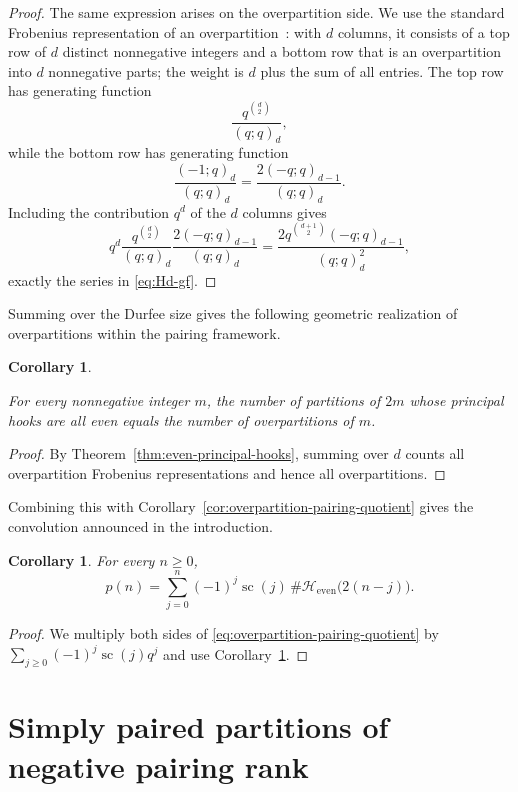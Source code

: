 \documentclass[11pt]{article}
\newtheorem{corollary}[theorem]{Corollary}
\theoremstyle{definition}
\theoremstyle{remark}
\begin{document}
\begin{proof}
The same expression arises on the overpartition side.  We use the standard Frobenius representation of an overpartition~\cite{Lovejoy2005}: with $d$ columns, it consists of a top row of $d$ distinct nonnegative integers and a bottom row that is an overpartition into $d$ nonnegative parts; the weight is $d$ plus the sum of all entries.  The top row has generating function
\[
 \frac{q^{\binom d2}}{(q;q)_d},
\]
while the bottom row has generating function
\[
 \frac{(-1;q)_d}{(q;q)_d}
 =\frac{2(-q;q)_{d-1}}{(q;q)_d}.
\]
Including the contribution $q^d$ of the $d$ columns gives
\[
 q^d\frac{q^{\binom d2}}{(q;q)_d}
 \frac{2(-q;q)_{d-1}}{(q;q)_d}
 =\frac{2q^{\binom{d+1}{2}}(-q;q)_{d-1}}{(q;q)_d^2},
\]
exactly the series in \eqref{eq:Hd-gf}.  
\end{proof}

Summing over the Durfee size gives the following geometric realization of overpartitions within the pairing framework. 

\begin{corollary}\label{cor:even-hooks-overpartitions}

For every nonnegative integer $m$, the number of partitions of $2m$ whose principal hooks are all even equals the number of overpartitions of $m$.

\end{corollary}

\begin{proof}
By Theorem~\ref{thm:even-principal-hooks}, summing over $d$ counts all overpartition Frobenius representations and hence all overpartitions.
\end{proof}

Combining this with Corollary~\ref{cor:overpartition-pairing-quotient} gives the convolution announced in the introduction.

\begin{corollary}\label{cor:even-hooks-convolution}
For every $n\geq0$,
\[
 p(n)=\sum_{j=0}^n(-1)^j\operatorname{sc}(j)\,
 \#\mathcal H_{\mathrm{even}}\bigl(2(n-j)\bigr).
\]
\end{corollary}

\begin{proof}
We multiply both sides of \eqref{eq:overpartition-pairing-quotient} by
$\sum_{j\geq0}(-1)^j\operatorname{sc}(j)q^j$ and use
Corollary~\ref{cor:even-hooks-overpartitions}.
\end{proof}

\section{Simply paired partitions of negative pairing rank}
\end{document}
